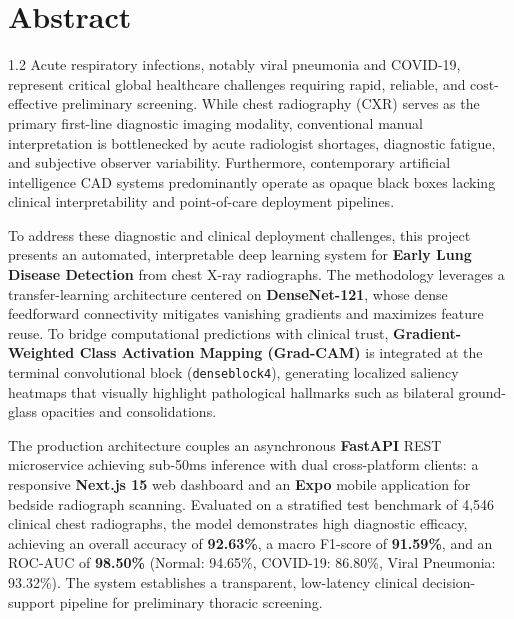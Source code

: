 \chapter*{Abstract}%
%
\vspace{-25pt}

\begin{spacing}{1.2}
\noindent Acute respiratory infections, notably viral pneumonia and COVID-19, represent critical global healthcare challenges requiring rapid, reliable, and cost-effective preliminary screening. While chest radiography (CXR) serves as the primary first-line diagnostic imaging modality, conventional manual interpretation is bottlenecked by acute radiologist shortages, diagnostic fatigue, and subjective observer variability. Furthermore, contemporary artificial intelligence CAD systems predominantly operate as opaque black boxes lacking clinical interpretability and point-of-care deployment pipelines.

\vspace{8pt}

\noindent To address these diagnostic and clinical deployment challenges, this project presents an automated, interpretable deep learning system for \textbf{Early Lung Disease Detection} from chest X-ray radiographs. The methodology leverages a transfer-learning architecture centered on \textbf{DenseNet-121}, whose dense feedforward connectivity mitigates vanishing gradients and maximizes feature reuse. To bridge computational predictions with clinical trust, \textbf{Gradient-Weighted Class Activation Mapping (Grad-CAM)} is integrated at the terminal convolutional block (\texttt{denseblock4}), generating localized saliency heatmaps that visually highlight pathological hallmarks such as bilateral ground-glass opacities and consolidations.

\vspace{8pt}

\noindent The production architecture couples an asynchronous \textbf{FastAPI} REST microservice achieving sub-50ms inference with dual cross-platform clients: a responsive \textbf{Next.js 15} web dashboard and an \textbf{Expo} mobile application for bedside radiograph scanning. Evaluated on a stratified test benchmark of 4,546 clinical chest radiographs, the model demonstrates high diagnostic efficacy, achieving an overall accuracy of \textbf{92.63\%}, a macro F1-score of \textbf{91.59\%}, and an ROC-AUC of \textbf{98.50\%} (Normal: 94.65\%, COVID-19: 86.80\%, Viral Pneumonia: 93.32\%). The system establishes a transparent, low-latency clinical decision-support pipeline for preliminary thoracic screening.
\end{spacing}

\thispagestyle{plain}
